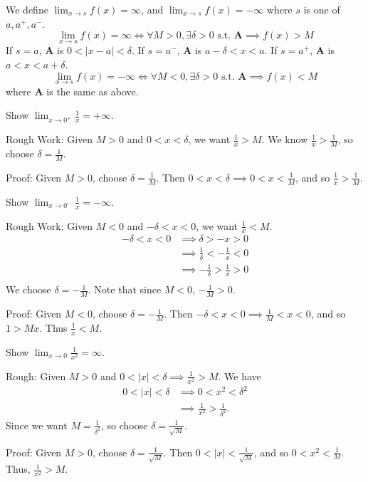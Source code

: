 \documentclass{article}
\begin{document}
\begin{definition}
We define $\lim_{x\to s} f(x) = \infty$, and $\lim_{x\to s} f(x) = -\infty$ where $s$ is one of $a, a^+, a^-$.
\[
\lim_{x \to s} f(x) = \infty \iff \forall M > 0, \exists \delta > 0 \text{ s.t. } \textbf{A} \implies f(x) > M 
\]
If $s = a$, \textbf{A} is $0 < |x-a| < \delta$.
If $s = a^-$, \textbf{A} is $a - \delta < x <  a$.
If $s = a^+$, \textbf{A} is $a < x < a + \delta$.
\[
\lim_{x \to s} f(x) = -\infty \iff \forall M < 0, \exists \delta > 0 \text{ s.t. } \textbf{A} \implies f(x) < M 
\]
where \textbf{A} is the same as above.
\end{definition}
\begin{example}
Show $\lim_{x\to 0^+} \frac{1}{x} = + \infty$.

Rough Work: Given $M > 0$ and $0 < x < \delta$, we want $\frac{1}{x} > M$. We know $\frac{1}{x} > \frac{1}{M}$, so choose $\delta = \frac{1}{M}$.

Proof: Given $M > 0$, choose $\delta = \frac{1}{M}$. Then $0 < x < \delta \implies 0 < x < \frac{1}{M}$, and so $\frac{1}{x} > \frac{1}{M}$.
\end{example}
\begin{example}
Show $\lim_{x\to 0^-} \frac{1}{x} = - \infty$.

Rough Work: Given $M < 0$ and $-\delta < x < 0$, we want $\frac{1}{x} < M$. \begin{align*}
    -\delta < x < 0 &\implies \delta > -x > 0\\
    &\implies \frac{1}{\delta} < -\frac{1}{x} < 0\\
    &\implies -\frac{1}{\delta} > \frac{1}{x} > 0\\
\end{align*}
We choose $\delta = -\frac{1}{M}$. Note that since $M < 0$, $-\frac{1}{M} > 0$.

Proof: Given $M < 0$, choose $\delta = -\frac{1}{M}$. Then $-\delta < x < 0 \implies \frac{1}{M}  < x < 0$, and so $1> Mx$. Thus $\frac{1}{x} < M$.
\end{example}
\begin{example}
Show $\lim_{x\to 0} \frac{1}{x^2} = \infty$.

Rough: Given $M > 0$ and $0 < |x| < \delta \implies \frac{1}{x^2} > M$. We have \begin{align*}
    0 < |x| < \delta &\implies 0 < x^2 < \delta^2\\
    &\implies \frac{1}{x^2} > \frac{1}{\delta^2}. 
\end{align*}
Since we want $M = \frac{1}{\delta^2}$, so choose $\delta = \frac{1}{\sqrt{M}}$.

Proof:
Given $M > 0$, choose $\delta = \frac{1}{\sqrt{M}}$. Then $0 < |x| < \frac{1}{\sqrt{M}}$, and so $0 < x^2 < \frac{1}{M}$. Thus, $\frac{1}{x^2} > M$.
\end{example}
\end{document}
